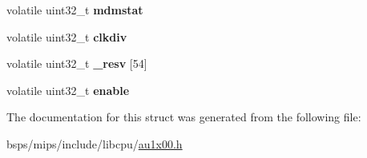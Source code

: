 \begin{DoxyCompactItemize}
volatile uint32\+\_\+t {\bfseries mdmstat}
\item 
\mbox{\label{structau1x00__uart__t_a53a845dfec581cf5d75fc291b0204da4}} 
volatile uint32\+\_\+t {\bfseries clkdiv}
\item 
\mbox{\label{structau1x00__uart__t_a189be85c6c7d1ea7d45ff842def417c1}} 
volatile uint32\+\_\+t {\bfseries \+\_\+resv} \mbox{[}54\mbox{]}
\item 
\mbox{\label{structau1x00__uart__t_a43814a046f7584160631904ca63bb3d0}} 
volatile uint32\+\_\+t {\bfseries enable}
\end{DoxyCompactItemize}


The documentation for this struct was generated from the following file\+:\begin{DoxyCompactItemize}
\item 
bsps/mips/include/libcpu/\mbox{\hyperlink{au1x00_8h}{au1x00.\+h}}\end{DoxyCompactItemize}
